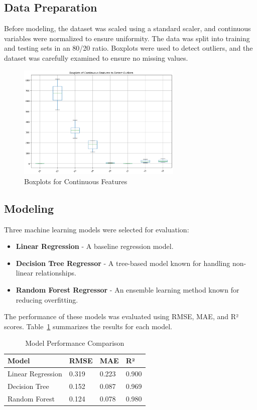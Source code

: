 \documentclass[12pt]{article}
\begin{document}
\subsection{Data Preparation}
Before modeling, the dataset was scaled using a standard scaler, and continuous variables were normalized to ensure uniformity. The data was split into training and testing sets in an 80/20 ratio. Boxplots were used to detect outliers, and the dataset was carefully examined to ensure no missing values.

\begin{figure}[H]
    \centering
    \includegraphics[width=0.7\textwidth]{boxplot.png}
    \caption{Boxplots for Continuous Features}
    \label{fig:boxplot}
\end{figure}

\subsection{Modeling}
Three machine learning models were selected for evaluation:
\begin{itemize}
    \item \textbf{Linear Regression} - A baseline regression model.
    \item \textbf{Decision Tree Regressor} - A tree-based model known for handling non-linear relationships.
    \item \textbf{Random Forest Regressor} - An ensemble learning method known for reducing overfitting.
\end{itemize}

The performance of these models was evaluated using RMSE, MAE, and R² scores. Table~\ref{tab:model_performance} summarizes the results for each model.

\begin{table}[H]
    \centering
    \caption{Model Performance Comparison}
    \label{tab:model_performance}
    \begin{tabular}{l l l l}
        \toprule
        \textbf{Model} & \textbf{RMSE} & \textbf{MAE} & \textbf{R²} \\
        \midrule
        Linear Regression & 0.319 & 0.223 & 0.900 \\
        Decision Tree & 0.152 & 0.087 & 0.969 \\
        Random Forest & 0.124 & 0.078 & 0.980 \\
        \bottomrule
    \end{tabular}
\end{table}
\end{document}
